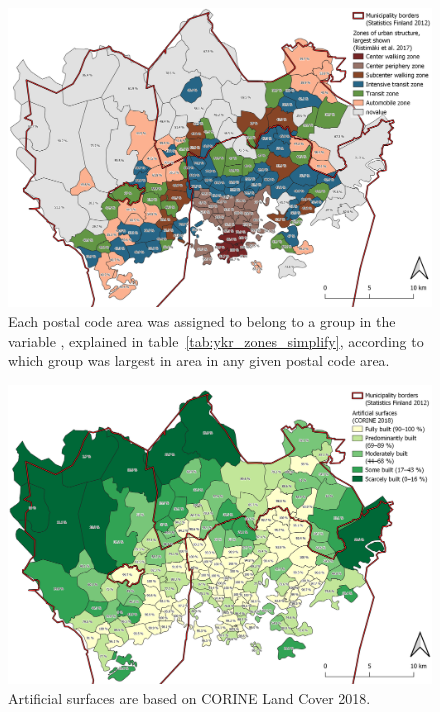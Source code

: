 \begin{figure}[H]%
    \centering
    \includegraphics[width=\textwidth]{images/thesis_postalvis_ykrzone.png}
    \caption[Calculated zones of urban structure in the research area]{Each postal code area was assigned to belong to a group in the variable , explained in table~\ref{tab:ykr_zones_simplify}, according to which group was largest in area in any given postal code area.}%
    \label{fig:postalvis_ykrzone}%
\end{figure}

\begin{figure}[H]%
    \centering
    \includegraphics[width=\textwidth]{images/thesis_postalvis_artificial.png}
    \caption[Calculated zones of built surfaces in the research area]{Artificial surfaces are based on CORINE Land Cover 2018.}%
    \label{fig:postalvis_artificial}%
\end{figure}

